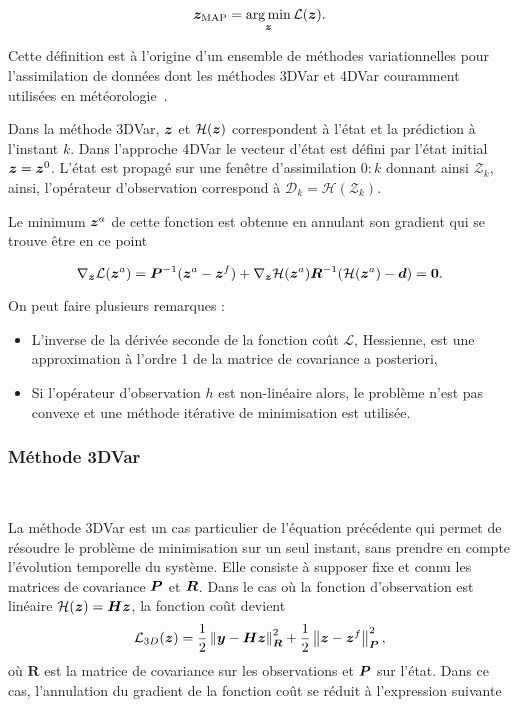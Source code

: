 \begin{equation*}
    \bm z_{\text{MAP}} = \operatorname*{arg\,min}_{\bm z} \mathcal L(\bm z).
\end{equation*}

Cette définition est à l'origine d'un ensemble de méthodes variationnelles pour l'assimilation de données dont les méthodes 3DVar et 4DVar couramment utilisées en météorologie~\cite{talagrand1997assimilation}.

Dans la méthode 3DVar, $\bm z$ et $\mathcal H(\bm z)$ correspondent à l'état et la prédiction à l'instant $k$. Dans l'approche 4DVar le vecteur d'état est défini par l'état initial $\bm z = \bm z^0$. L'état est propagé sur une fenêtre d'assimilation $0:k$ donnant ainsi $\mathcal{Z}_k$, ainsi, l'opérateur d'observation correspond à $\mathcal D_k = \mathcal H(\mathcal{Z}_k)$.

Le minimum $\bm z^a$ de cette fonction est obtenue en annulant son gradient qui se trouve être en ce point

\begin{equation*}
    \nabla_{\bm z} \mathcal L(\bm z^a) = \bm{P}^{-1} (\bm z^a - \bm z^f) + \nabla_{\bm z} \mathcal H (\bm z^a) \bm{R}^{-1}(\mathcal H(\bm z^a) - \bm d) = \bm 0.
\end{equation*}

On peut faire plusieurs remarques :

\begin{itemize}
    \item L'inverse de la dérivée seconde de la fonction coût $\mathcal L$, Hessienne, est une approximation à l'ordre 1 de la matrice de covariance a posteriori,
    \item Si l'opérateur d'observation $h$ est non-linéaire alors, le problème n'est pas convexe et une méthode itérative de minimisation est utilisée.
\end{itemize}

\subsubsection{Méthode 3DVar}~\label{subsec:3dvar}

La méthode 3DVar est un cas particulier de l'équation précédente qui permet de résoudre le problème de minimisation sur un seul instant, sans prendre en compte l'évolution temporelle du système. Elle consiste à supposer fixe et connu les matrices de covariance $\bm{P}$ et $\bm{R}$. Dans le cas où la fonction d'observation est linéaire $\mathcal H(\bm z) = \bm{H} \bm z$, la fonction coût devient
\begin{equation*}
    \mathcal L_{3D}(\bm z) = \frac{1}{2}\left\lVert \bm{y}-\bm{H} \bm z \right\rVert^2_{\bm R} + \frac{1}{2}\left\lVert \bm z-\bm z^f \right\rVert_{\bm{P}}^2,
\end{equation*}où $\bm R$ est la matrice de covariance sur les observations et $\bm{P}$ sur l'état. Dans ce cas, l'annulation du gradient de la fonction coût se réduit à l'expression suivante

